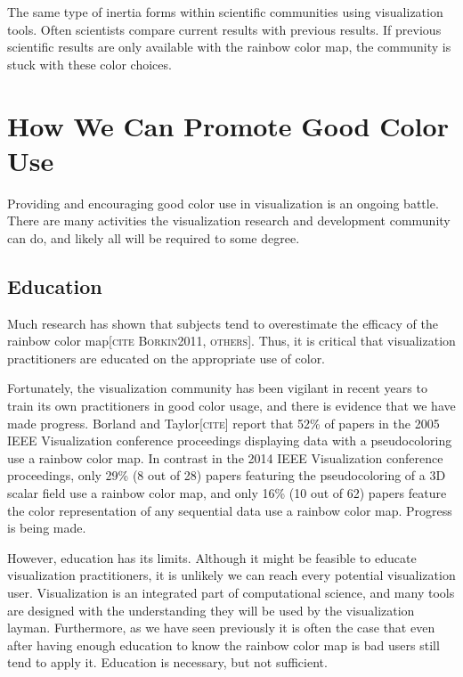 \documentclass[letterpaper,twocolumn,fleqn]{article}
\newcommand{\fix}[1]{{\color{red}\textsc{[#1]}}}
\begin{document}
The same type of inertia forms within scientific communities using
visualization tools. Often scientists compare current results with previous
results. If previous scientific results are only available with the rainbow
color map, the community is stuck with these color choices.


\section{How We Can Promote Good Color Use}

\noindent
Providing and encouraging good color use in visualization is an ongoing
battle. There are many activities the visualization research and
development community can do, and likely all will be required to some
degree.

\subsection{Education}

\noindent
Much research has shown that subjects tend to overestimate the efficacy of
the rainbow color map\fix{cite Borkin2011, others}. Thus, it is critical
that visualization practitioners are educated on the appropriate use of
color.

Fortunately, the visualization community has been vigilant in recent years
to train its own practitioners in good color usage, and there is evidence
that we have made progress. Borland and Taylor\fix{cite} report that 52\%
of papers in the 2005 IEEE Visualization conference proceedings displaying
data with a pseudocoloring use a rainbow color map. In contrast in the
2014 IEEE Visualization conference proceedings, only 29\% (8 out of 28)
papers featuring the pseudocoloring of a 3D scalar field use a rainbow
color map, and only 16\% (10 out of 62) papers feature the color
representation of any sequential data use a rainbow color map. Progress is
being made.

However, education has its limits. Although it might be feasible to educate
visualization practitioners, it is unlikely we can reach every potential
visualization user. Visualization is an integrated part of computational
science, and many tools are designed with the understanding they will be
used by the visualization layman. Furthermore, as we have seen previously
it is often the case that even after having enough education to know the
rainbow color map is bad users still tend to apply it. Education is
necessary, but not sufficient.
\end{document}
